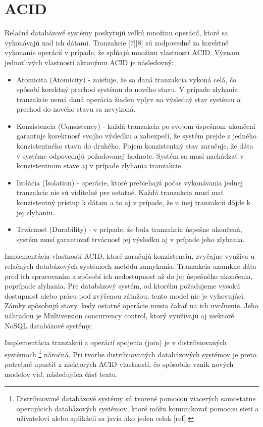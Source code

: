 \documentclass[11pt,twoside,a4paper]{book}
\begin{document}
\section{ACID}

Relačné databázové systémy poskytujú veľkú množinu operácií, ktoré sa vykonávajú nad ich  dátami. Tranzakcie [7][8] sú zodpovedné za korektné vykonanie operácií v prípade, že spĺňajú množinu vlastností ACID. Význam jednotlivých vlastností akronýmu ACID je následovný:

\begin{itemize}
  \item Atomicita (Atomicity) - zaisťuje, že sa daná tranzakcia vykoná celá, čo spôsobí korektný prechod systému do nového stavu. V prípade zlyhania tranzakcie nemá daná operácia žiaden vplyv na výsledný stav systému a prechod do nového stavu sa nevykoná.
  \item Konzistencia (Consistency) - každá tranzakcia po svojom úspešnom ukončení garantuje korektnosť svojho výsledku a zabezpečí, že systém prejde z jedného konzistentného stavu do druhého. Pojem konzistentný stav zaručuje, že dáta v systéme odpovedajú požadovanej hodnote. Systém sa musí nachádzať v konzistentnom stave aj v prípade zlyhania tranzakcie.
  \item Izolácia (Isolation) - operácie, ktoré prebiehajú počas vykonávania jednej tranzakcie nie sú viditeľné pre ostatné. Každá tranzakcia musí mať konzistentný prístup k dátam a to aj v prípade, že u inej tranzakcii dôjde k jej zlyhaniu.
  \item Trvácnosť (Durability) - v prípade, že bola tranzakcia úspešne ukončená, systém musí garantovať trvácnosť jej výsledku aj v prípade jeho zlyhania.
\end{itemize}

Implementácia vlastností ACID, ktoré zaručujú konzistenciu, zvyčajne využíva u relačných databázových systémoch metódu zamykania. Tranzakcia uzamkne dáta pred ich spracovaním a spôsobí ich nedostupnosť až do jej úspešného ukončenia, poprípade zlyhania. Pre databázový systém, od ktoréhu požadujeme vysokú dostupnosť alebo prácu pod zvýšenou záťažou, tento model nie je vyhovujúci. Zámky spôsobujú stavy, kedy ostatné operácie musia čakať na ich uvoľnenie. Jeho náhradou je Multiversion concurrency control, ktorý využívajú aj niektoré NoSQL databázové systémy.

Implementácia tranzakcií a operácií spojenia (join) je v distribuovaných systémoch \footnote{Distribuované databázové systémy sú tvorené pomocou viacerých samostatne operujúcich databázových systémov, ktoré môžu komunikovať pomocou sieti a užívateľovi alebo aplikácii sa javia ako jeden celok [ref].} náročná. Pri tvorbe distribuovaných databázových systémov je preto potrebné upustiť z niektorých ACID vlastností, čo spôsobilo vznik nových modelov viď. následujúca čásť textu.
\end{document}
